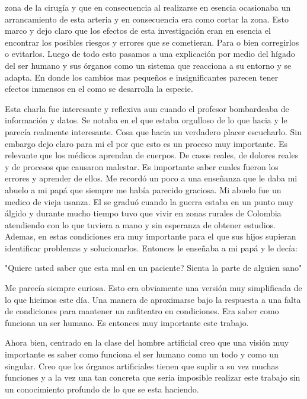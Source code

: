 \documentclass[12pt]{exam}
\begin{document}
zona de la cirugía y que en consecuencia al realizarse en esencia ocasionaba un arrancamiento de esta arteria y en consecuencia era como cortar la zona. Esto marco y dejo claro que los efectos de esta investigación eran en esencia el encontrar los posibles riesgos y errores que se cometieran. Para o bien corregirlos o evitarlos. Luego de todo esto pasamos a una explicación por medio del hígado del ser humano y sus órganos como un sistema que reacciona a su entorno y se adapta. En donde los cambios mas pequeños e insignificantes parecen tener efectos inmensos en el como se desarrolla la especie.

Esta charla fue interesante y reflexiva aun cuando el profesor bombardeaba de información y datos. Se notaba en el que estaba orgulloso de lo que hacia y le parecía realmente interesante. Cosa que hacia un verdadero placer escucharlo. Sin embargo dejo claro para mi el por que esto es un proceso muy importante. Es relevante que los médicos aprendan de cuerpos. De casos reales, de dolores reales y de procesos que causaron malestar. Es importante saber cuales fueron los errores y aprender de ellos. Me recordó un poco a una enseñanza que le daba mi abuelo a mi papá que siempre me había parecido graciosa. Mi abuelo fue un medico de vieja usanza. El se graduó cuando la guerra estaba en un punto muy álgido y durante mucho tiempo tuvo que vivir en zonas rurales de Colombia atendiendo con lo que tuviera a mano y sin esperanza de obtener estudios. Ademas, en estas condiciones era muy importante para el que sus hijos supieran identificar problemas y solucionarlos. Entonces le enseñaba a mi papá y le decía:

"Quiere usted saber que esta mal en un paciente? Sienta la parte de alguien sano"

Me parecía siempre curiosa. Esto era obviamente una versión muy simplificada de lo que hicimos este día. Una manera de aproximarse bajo la respuesta a una falta de condiciones para mantener un anfiteatro en condiciones. Era saber como funciona un ser humano. Es entonces muy importante este trabajo.

Ahora bien, centrado en la clase del hombre artificial creo que una visión muy importante es saber como funciona el ser humano como un todo y como un singular. Creo que los órganos artificiales tienen que suplir a su vez muchas funciones y a la vez una tan concreta que seria imposible realizar este trabajo sin un conocimiento profundo de lo que se esta haciendo.
\end{document}
